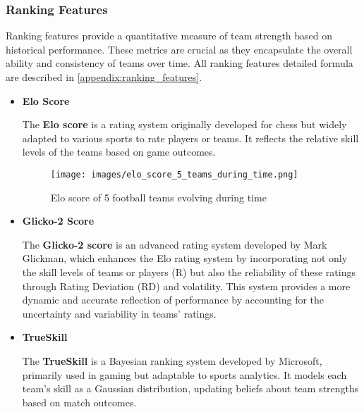 \subsubsection{Ranking Features}
\label{subsubsec:ranking_features}

Ranking features provide a quantitative measure of team strength based on historical performance. These metrics are crucial as they encapsulate the overall ability and consistency of teams over time. All ranking features detailed formula are described in \ref{appendix:ranking_features}.

\begin{itemize}

\item \textbf{Elo Score}
\label{par:elo_score}

The \textbf{Elo score} \cite{Elo1978} \cite{HvattumArntzen2010} is a rating system originally developed for chess but widely adapted to various sports to rate players or teams. It reflects the relative skill levels of the teams based on game outcomes.

\begin{figure}[H]
    \centering
    \texttt{[image: images/elo\_score\_5\_teams\_during\_time.png]}
    \caption{Elo score of 5 football teams evolving during time}
    \label{fig:elo_score_5_teams_during_time}
\end{figure}



\item \textbf{Glicko-2 Score}
\label{par:glicko2_score}

The \textbf{Glicko-2 score} \cite{Glickman1999} is an advanced rating system developed by Mark Glickman, which enhances the Elo rating system by incorporating not only the skill levels of teams or players (R) but also the reliability of these ratings through Rating Deviation (RD) and volatility. This system provides a more dynamic and accurate reflection of performance by accounting for the uncertainty and variability in teams' ratings.


\item \textbf{TrueSkill}
\label{par:trueskill}

The \textbf{TrueSkill} \cite{HerbrichEtAl2007} is a Bayesian ranking system developed by Microsoft, primarily used in gaming but adaptable to sports analytics. It models each team's skill as a Gaussian distribution, updating beliefs about team strengths based on match outcomes.

\end{itemize}


